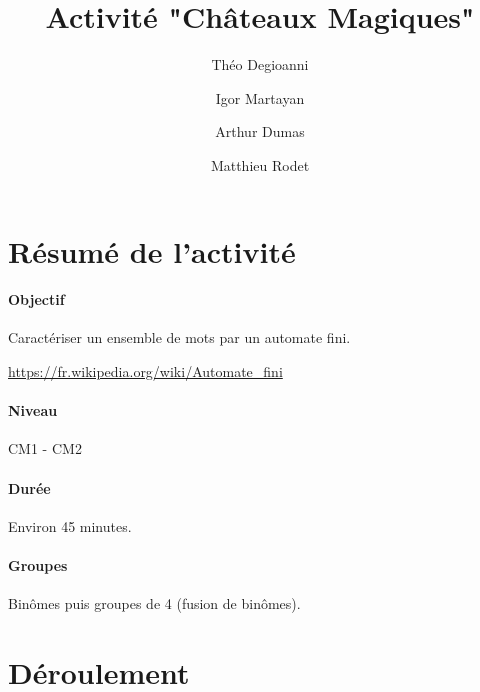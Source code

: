 \documentclass[a4paper,11pt]{article}%
\title{Activité "Châteaux Magiques"}%
\author{Théo Degioanni \and Igor Martayan \and Arthur Dumas \and Matthieu Rodet}%
\date{}%
\begin{document}
%

\maketitle%

\section{Résumé de l'activité}

\paragraph{Objectif}
Caractériser un ensemble de mots par un automate fini.

\url{https://fr.wikipedia.org/wiki/Automate_fini}

\paragraph{Niveau}
CM1 - CM2

\paragraph{Durée}
Environ 45 minutes.

\paragraph{Groupes}
Binômes puis groupes de 4 (fusion de binômes).

\section{Déroulement}
\end{document}
